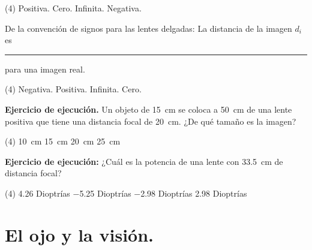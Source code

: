 \documentclass[12pt, letter]{exam}
\begin{document}
\begin{questions}
    \begin{tasks}(4)
        \task Positiva.
        \task Cero.
        \task Infinita.
        \task Negativa.
    \end{tasks}
    \question De la convención de signos para las lentes delgadas:  La distancia de la imagen $d_{i}$ es \rule{2cm}{0.1mm} para una imagen real.
    \begin{tasks}(4)
        \task Negativa.
        \task Positiva.
        \task Infinita.
        \task Cero.
    \end{tasks}
    \question \label{Problema_02} \textbf{Ejercicio de ejecución. } Un objeto de \SI{15}{\centi\meter} se coloca a \SI{50}{\centi\meter} de una lente positiva que tiene una distancia focal de \SI{20}{\centi\meter}. ¿De qué tamaño es la imagen?
    \begin{tasks}(4)
        \task \SI{10}{\centi\meter}
        \task \SI{15}{\centi\meter}
        \task \SI{20}{\centi\meter}
        \task \SI{25}{\centi\meter}
    \end{tasks}
    \question \label{Problema_03} \textbf{Ejercicio de ejecución: } ¿Cuál es la potencia de una lente con \SI{33.5}{\centi\meter} de distancia focal?
    \begin{tasks}(4)
        \task \num{4.26} Dioptrías
        \task \num{-5.25} Dioptrías
        \task \num{-2.98} Dioptrías
        \task \num{2.98} Dioptrías
    \end{tasks}

    \section{El ojo y la visión.}


\end{questions}
\end{document}
